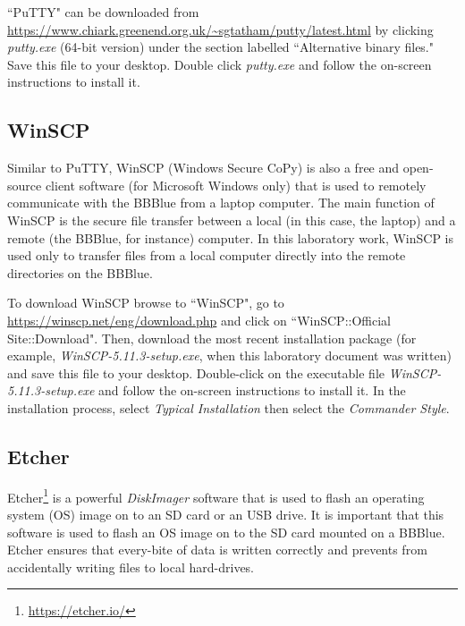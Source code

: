 \begin{mdframed}[frametitle=Download and installation, backgroundcolor=yellow!5, roundcorner=7pt,outerlinecolor= blue!70!black,outerlinewidth=1.2]
  ``PuTTY" can be downloaded from \url{https://www.chiark.greenend.org.uk/~sgtatham/putty/latest.html} by clicking \emph{putty.exe}  (64-bit version) under the section labelled ``Alternative binary files." Save this file to your desktop.  Double click \emph{putty.exe} and follow the on-screen instructions to install it. 
\end{mdframed}


\subsection{WinSCP}
\label{sec:winSCP}
Similar to PuTTY, WinSCP (Windows Secure CoPy) is also a free and open-source  client software (for Microsoft Windows only) that is used to remotely communicate with the BBBlue from a laptop computer. The main function of WinSCP is the secure file transfer between a local (in this case, the laptop) and a remote (the BBBlue, for instance) computer.  In this laboratory work, WinSCP is used only to transfer files from a local computer directly into the remote directories on the BBBlue. %

\begin{mdframed}[frametitle=Download and installation, backgroundcolor=yellow!5, roundcorner=7pt,outerlinecolor= blue!70!black,outerlinewidth=1.2]
  To download WinSCP browse to ``WinSCP", go to \url{https://winscp.net/eng/download.php} and click on ``WinSCP::Official Site::Download". Then, download the most recent installation package (for example, \emph{WinSCP-5.11.3-setup.exe}, when this laboratory document was written) and save this file to your desktop. Double-click on the executable file \emph{WinSCP-5.11.3-setup.exe} and follow the on-screen instructions to install it. In the installation process, select \emph{Typical Installation} then select the \emph{Commander Style}.
\end{mdframed}

\subsection{Etcher}
\label{sec:etcher}

Etcher\footnote{\href{https://etcher.io/}{https://etcher.io/}}  is  a powerful \emph{DiskImager} software that is used to flash an operating system (OS) image on to an SD card or an USB drive. It is important that this software is used to flash an OS image on to the  SD card mounted on a BBBlue. Etcher ensures that every-bite of data is written correctly and prevents  from accidentally writing files to local hard-drives. 

